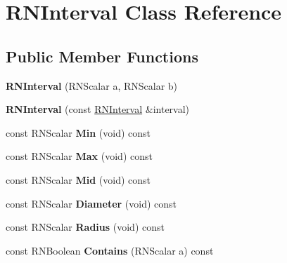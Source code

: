 \hypertarget{class_r_n_interval}{}\section{R\+N\+Interval Class Reference}
\label{class_r_n_interval}
\subsection*{Public Member Functions}
\begin{DoxyCompactItemize}
\item 
{\bfseries R\+N\+Interval} (R\+N\+Scalar a, R\+N\+Scalar b)\hypertarget{class_r_n_interval_a693e638a24a78dc441d8b8b6f42bc74b}{}\label{class_r_n_interval_a693e638a24a78dc441d8b8b6f42bc74b}

\item 
{\bfseries R\+N\+Interval} (const \hyperlink{class_r_n_interval}{R\+N\+Interval} \&interval)\hypertarget{class_r_n_interval_a670a91b77d49118fac724052e12a8ab7}{}\label{class_r_n_interval_a670a91b77d49118fac724052e12a8ab7}

\item 
const R\+N\+Scalar {\bfseries Min} (void) const \hypertarget{class_r_n_interval_ac8a4a043e70c5155ef5a93103c018293}{}\label{class_r_n_interval_ac8a4a043e70c5155ef5a93103c018293}

\item 
const R\+N\+Scalar {\bfseries Max} (void) const \hypertarget{class_r_n_interval_ae72d44c2a639b05a8e6fb5067b6b85c1}{}\label{class_r_n_interval_ae72d44c2a639b05a8e6fb5067b6b85c1}

\item 
const R\+N\+Scalar {\bfseries Mid} (void) const \hypertarget{class_r_n_interval_a977b148a3dd467a8787da1b1755d99fc}{}\label{class_r_n_interval_a977b148a3dd467a8787da1b1755d99fc}

\item 
const R\+N\+Scalar {\bfseries Diameter} (void) const \hypertarget{class_r_n_interval_ad100368f6bab5f463e759342d434d792}{}\label{class_r_n_interval_ad100368f6bab5f463e759342d434d792}

\item 
const R\+N\+Scalar {\bfseries Radius} (void) const \hypertarget{class_r_n_interval_a0a18c75c5b0645f45726b4adeb3b39c9}{}\label{class_r_n_interval_a0a18c75c5b0645f45726b4adeb3b39c9}

\item 
const R\+N\+Boolean {\bfseries Contains} (R\+N\+Scalar a) const \hypertarget{class_r_n_interval_aa8c769cfd4fc7d69ff9f59c924d2bc5e}{}\label{class_r_n_interval_aa8c769cfd4fc7d69ff9f59c924d2bc5e}


\end{DoxyCompactItemize}
